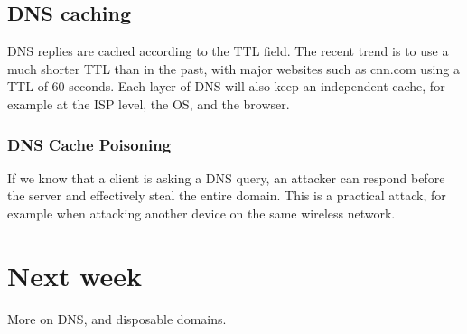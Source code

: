 \documentclass{idc_msc}
\begin{document}
\subsection{DNS caching}

DNS replies are cached according to the TTL field.
The recent trend is to use a much shorter TTL than in the past, with major websites such as cnn.com using a TTL of 60 seconds.
Each layer of DNS will also keep an independent cache, for example at the ISP level, the OS, and the browser.

\subsubsection{DNS Cache Poisoning}

If we know that a client is asking a DNS query, an attacker can respond before the server and effectively steal the entire domain.
This is a practical attack, for example when attacking another device on the same wireless network.

\section{Next week}

More on DNS, and disposable domains.
\end{document}
